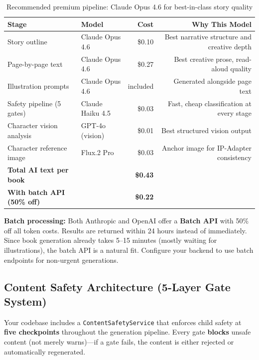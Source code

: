 \documentclass[12pt, letterpaper, oneside]{book}
\begin{document}
\begin{table}[H]
\centering
\begin{tabularx}{\textwidth}{lXrr}
\toprule
\textbf{Stage} & \textbf{Model} & \textbf{Cost} & \textbf{Why This Model} \\
\midrule
Story outline & Claude Opus 4.6 & \$0.10 & Best narrative structure and creative depth \\
Page-by-page text & Claude Opus 4.6 & \$0.27 & Best creative prose, read-aloud quality \\
Illustration prompts & Claude Opus 4.6 & included & Generated alongside page text \\
Safety pipeline (5 gates) & Claude Haiku 4.5 & \$0.03 & Fast, cheap classification at every stage \\
Character vision analysis & GPT-4o (vision) & \$0.01 & Best structured vision output \\
Character reference image & Flux.2 Pro & \$0.03 & Anchor image for IP-Adapter consistency \\
\midrule
\textbf{Total AI text per book} & & \textbf{\$0.43} & \\
\textbf{With batch API (50\% off)} & & \textbf{\$0.22} & \\
\bottomrule
\end{tabularx}
\caption{Recommended premium pipeline: Claude Opus 4.6 for best-in-class story quality}
\end{table}

\begin{infobox}
\textbf{Batch processing:} Both Anthropic and OpenAI offer a \textbf{Batch API} with 50\% off all token costs. Results are returned within 24 hours instead of immediately. Since book generation already takes 5--15 minutes (mostly waiting for illustrations), the batch API is a natural fit. Configure your backend to use batch endpoints for non-urgent generations.
\end{infobox}

\subsection{Content Safety Architecture (5-Layer Gate System)}

Your codebase includes a \texttt{ContentSafetyService} that enforces child safety at \textbf{five checkpoints} throughout the generation pipeline. Every gate \textbf{blocks} unsafe content (not merely warns)---if a gate fails, the content is either rejected or automatically regenerated.
\end{document}
